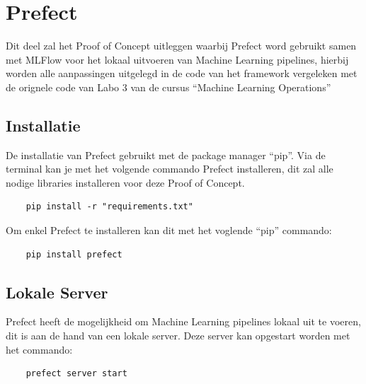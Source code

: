\section{Prefect}
Dit deel zal het Proof of Concept uitleggen waarbij Prefect word gebruikt samen met MLFlow voor het lokaal uitvoeren van Machine Learning pipelines, hierbij worden alle aanpassingen uitgelegd in de code van het framework vergeleken met de orignele code van Labo 3 van de cursus ``Machine Learning Operations''
\subsection{Installatie}
De installatie van Prefect gebruikt met de package manager ``pip''. Via de terminal kan je met het volgende commando Prefect installeren, dit zal alle nodige libraries installeren voor deze Proof of Concept.
\begin{verbatim}
    pip install -r "requirements.txt"
\end{verbatim}

Om enkel Prefect te installeren kan dit met het voglende ``pip'' commando:
\begin{verbatim}
    pip install prefect
\end{verbatim}

\subsection{Lokale Server}
Prefect heeft de mogelijkheid om Machine Learning pipelines lokaal uit te voeren, dit is aan de hand van een lokale server. 
Deze server kan opgestart worden met het commando: 
\begin{verbatim}
    prefect server start
\end{verbatim}


